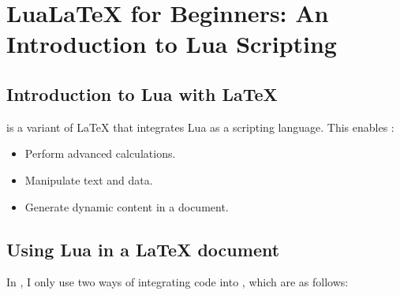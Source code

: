 \newpage


\section{LuaLaTeX for Beginners: An Introduction to Lua Scripting} %
\label{sec:lua_with_lualatex}


\subsection{Introduction to Lua with LaTeX} %
\label{sub:introduction_to_lua_with_latex}
\tkzEngine{\LUALATEX} is a variant of LaTeX that integrates Lua as a scripting language. This enables :

\begin{itemize}
  \item Perform advanced calculations.
  \item Manipulate text and data.
  \item Generate dynamic content in a document.
\end{itemize}

\subsection{Using Lua in a LaTeX document} %
\label{sub:using_lua_in_a_latex_document}
In , I only use two ways of integrating code into , which are as follows:

